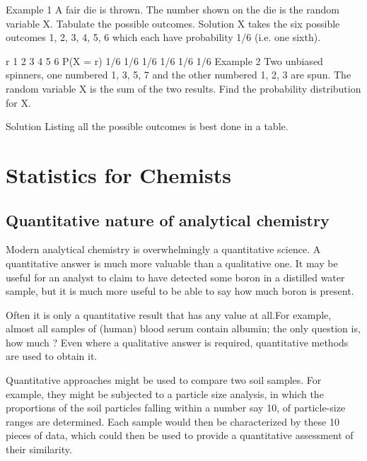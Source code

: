 Example 1
A fair die is thrown. The number shown on the die is the random variable X. Tabulate the possible outcomes.
Solution
X takes the six possible outcomes 1, 2, 3, 4, 5, 6 which each have probability 1/6 (i.e. one sixth).

r 	1 	2 	3 	4 	5 	6
P(X = r)	1/6 	1/6 	1/6 	1/6 	1/6 	1/6
Example 2
Two unbiased spinners, one numbered 1, 3, 5, 7 and the other numbered 1, 2, 3 are spun. The random variable X is the sum of the two results.
Find the probability distribution for X.



Solution
Listing all the possible outcomes is best done in a table.

%
%
%
%

\newpage
\chapter{Statistics for Chemists}

\section{Quantitative nature of analytical chemistry}
Modern analytical chemistry is overwhelmingly a quantitative science.
A quantitative answer is much more valuable than a qualitative one.
It may be useful for an analyst to claim to have detected some boron in a
distilled water sample, but it is much more useful to be able to say how
much boron is present.

Often it is only a quantitative result that has any value at all.For
example, almost all samples of (human) blood serum contain albumin;
the only question is, how much ? Even where a qualitative answer is required, quantitative methods are
used to obtain it.

Quantitative approaches might be used to compare two soil samples. For example, they might be subjected to a particle
size analysis, in which the proportions of the soil particles falling within a number say 10, of particle-size ranges are determined. Each sample would then be characterized by these 10 pieces of data, which could
then be used to provide a quantitative assessment of their similarity.

